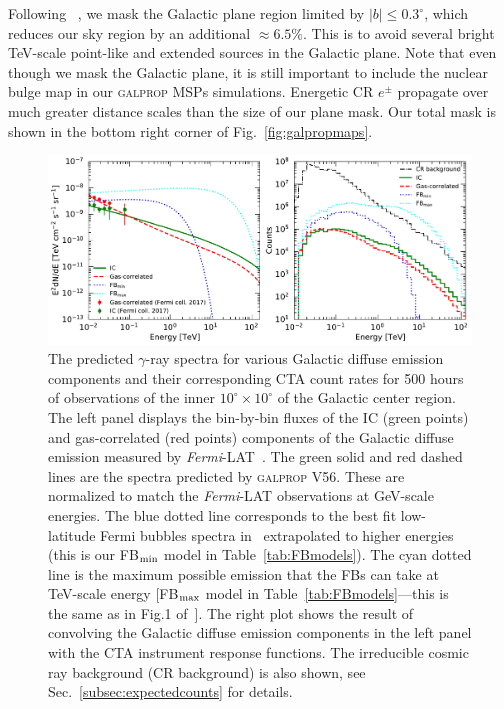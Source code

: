 \documentclass[doublespace,draft,nopageskip]{VTthesis} %
\begin{document}
Following ~\cite{Rinchiuso:2020skh}, we mask the Galactic plane region limited by $\lvert b \rvert \leq 0.3^\circ$, which reduces our sky region by an additional $\approx 6.5\%$. This is to avoid several bright TeV-scale point-like and extended sources in the Galactic plane. Note that even though we mask the Galactic plane, it is still important to include the nuclear bulge map in our \textsc{galprop} MSPs simulations. Energetic CR $e^{\pm}$ propagate over much greater distance scales than the size of our plane mask. Our total mask is shown in the bottom right corner of Fig.~\ref{fig:galpropmaps}.

\begin{figure}
    \begin{center}
    \includegraphics[scale = 0.55]{Figures/CTA/spectra-and-counts.pdf}
\caption{The predicted $\gamma$-ray spectra for various Galactic diffuse emission components and their corresponding CTA count rates for 500 hours of observations of the inner $10^\circ \times 10^\circ$ of the Galactic center region. The left panel displays the bin-by-bin fluxes of the IC (green points) and gas-correlated (red points) components of the Galactic diffuse emission measured by \textit{Fermi}-LAT~\citep{TheFermi-LAT:2017vmf}. The green solid and red dashed lines are the spectra predicted by \textsc{galprop V56}. These are normalized to match the \textit{Fermi}-LAT observations at GeV-scale energies. The blue dotted line corresponds to the best fit low-latitude Fermi bubbles spectra in~\citep{TheFermi-LAT:2017vmf} extrapolated to higher energies (this is our FB$_{\rm min}$ model in Table~\ref{tab:FBmodels}). The cyan dotted line is the maximum possible emission that the FBs can take at TeV-scale energy [FB$_{\rm max}$ model in Table~\ref{tab:FBmodels}---this is the same as in Fig.1 of~\citet{Rinchiuso:2020skh}]. The right plot shows the result of convolving the Galactic diffuse emission components in the left panel with the CTA instrument response functions. The irreducible cosmic ray background (CR background) is also shown, see Sec.~\ref{subsec:expectedcounts} for details.}\label{fig:counts_spectra}
    \end{center}
\end{figure}
\end{document}
